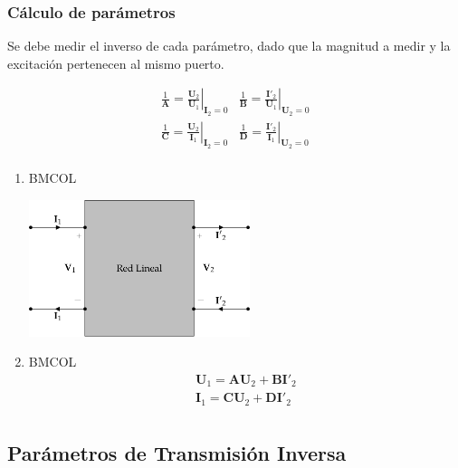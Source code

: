 \subsubsection{Cálculo de parámetros}
\label{sec:org99ce061}

Se debe medir el inverso de cada parámetro, dado que la magnitud a medir y la excitación pertenecen al mismo puerto.

\renewcommand{\arraystretch}{3}
\[
  \begin{array}{cc}
    \frac{1}{\mathbf{A}} = \left.\frac{\mathbf{U}_2}{\mathbf{U}_1}\right\rvert_{\mathbf{I}_2 = 0} &
    \frac{1}{\mathbf{B}} = \left.\frac{\mathbf{I'}_2}{\mathbf{U}_1}\right\rvert_{\mathbf{U}_2 = 0}\\
    \frac{1}{\mathbf{C}} = \left.\frac{\mathbf{U}_2}{\mathbf{I}_1}\right\rvert_{\mathbf{I}_2 = 0} &
    \frac{1}{\mathbf{D}} = \left.\frac{\mathbf{I'}_2}{\mathbf{I}_1}\right\rvert_{\mathbf{U}_2 = 0}\\
  \end{array}
\]

\begin{enumerate}
\item \hfill{}\textsc{BMCOL}
\label{sec:orga42aeb3}

\includegraphics[height=4cm]{../figs/cuadripolo_transmision.pdf}


\item \hfill{}\textsc{BMCOL}
\label{sec:orgb82d084}
\renewcommand{\arraystretch}{1}
\[
\begin{array}{l}
  \mathbf{U}_1 = \mathbf{A} \mathbf{U}_2 + \mathbf{B}\mathbf{I'}_2\\
  \mathbf{I}_1 = \mathbf{C} \mathbf{U}_2 + \mathbf{D} \mathbf{I'}_2\\
\end{array}
\]
\end{enumerate}


\subsection{Parámetros de Transmisión Inversa}
\label{sec:orgd62a71b}

